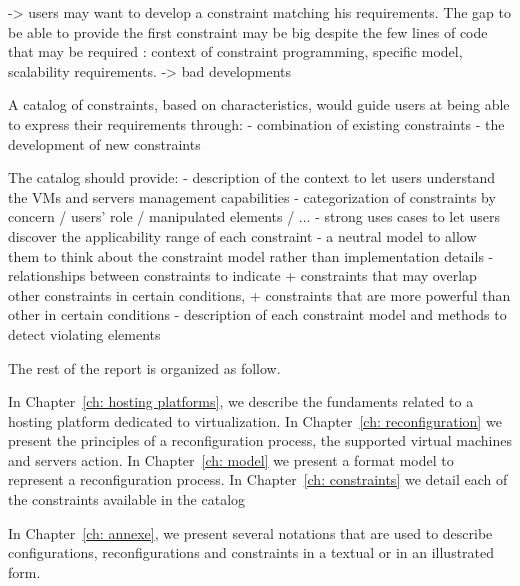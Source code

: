 -> users may want to develop a constraint matching his requirements.
   The gap to be able to provide the first constraint may be big despite the few lines of code that may be required : context of constraint programming, specific model, scalability requirements.
   -> bad developments


A catalog of constraints, based on {\btrp} characteristics, would guide users at being
able to express their requirements through:
     - combination of existing constraints
     - the development of new constraints

The catalog should provide:
     - description of the context to let users understand the VMs and servers management capabilities
     - categorization of constraints by concern / users' role / manipulated elements / ...
     - strong uses cases to let users discover the applicability range of each constraint    
     - a neutral model to allow them to think about the constraint model rather than implementation details
     - relationships between constraints to indicate
           + constraints that may overlap other constraints in certain conditions,
	   + constraints that are more powerful than other in certain conditions
     - description of each constraint model and methods to detect violating elements
     
The rest of the report is organized as follow.

In Chapter~\ref{ch: hosting platforms}, we describe the fundaments related to a hosting platform dedicated to virtualization.
%
In Chapter~\ref{ch: reconfiguration} we present the principles of a reconfiguration process, the supported virtual machines and servers action.
%
In Chapter~\ref{ch: model} we present a format model to represent a reconfiguration process.
%
In Chapter~\ref{ch: constraints} we detail each of the constraints available in the catalog

In Chapter~\ref{ch: annexe}, we present several notations that are used to describe configurations, reconfigurations and constraints in a textual or in an illustrated form.